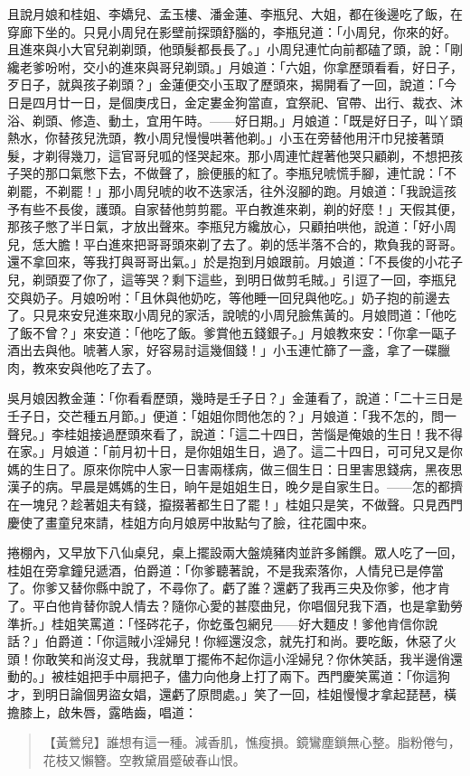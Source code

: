 且說月娘和桂姐、李嬌兒、孟玉樓、潘金蓮、李瓶兒、大姐，都在後邊吃了飯，在穿廊下坐的。只見小周兒在影壁前探頭舒腦的，李瓶兒道：「小周兒，你來的好。且進來與小大官兒剃剃頭，他頭髮都長長了。」小周兒連忙向前都磕了頭，說：「剛纔老爹吩咐，交小的進來與哥兒剃頭。」月娘道：「六姐，你拿歷頭看看，好日子，歹日子，就與孩子剃頭？」金蓮便交小玉取了歷頭來，揭開看了一回，說道：「今日是四月廿一日，是個庚戌日，金定婁金狗當直，宜祭祀、官帶、出行、裁衣、沐浴、剃頭、修造、動土，宜用午時。——好日期。」月娘道：「既是好日子，叫丫頭熱水，你替孩兒洗頭，教小周兒慢慢哄著他剃。」小玉在旁替他用汗巾兒接著頭髮，才剃得幾刀，這官哥兒呱的怪哭起來。那小周連忙趕著他哭只顧剃，不想把孩子哭的那口氣憋下去，不做聲了，臉便脹的紅了。李瓶兒唬慌手腳，連忙說：「不剃罷，不剃罷！」那小周兒唬的收不迭家活，往外沒腳的跑。月娘道：「我說這孩予有些不長俊，護頭。自家替他剪剪罷。平白教進來剃，剃的好麼！」天假其便，那孩子憋了半日氣，才放出聲來。李瓶兒方纔放心，只顧拍哄他，說道：「好小周兒，恁大膽！平白進來把哥哥頭來剃了去了。剃的恁半落不合的，欺負我的哥哥。還不拿回來，等我打與哥哥出氣。」於是抱到月娘跟前。月娘道：「不長俊的小花子兒，剃頭耍了你了，這等哭？剩下這些，到明日做剪毛賊。」引逗了一回，李瓶兒交與奶子。月娘吩咐：「且休與他奶吃，等他睡一回兒與他吃。」奶子抱的前邊去了。只見來安兒進來取小周兒的家活，說唬的小周兒臉焦黃的。月娘問道：「他吃了飯不曾？」來安道：「他吃了飯。爹賞他五錢銀子。」月娘教來安：「你拿一甌子酒出去與他。唬著人家，好容易討這幾個錢！」小玉連忙篩了一盞，拿了一碟臘肉，教來安與他吃了去了。

吳月娘因教金蓮：「你看看歷頭，幾時是壬子日？」金蓮看了，說道：「二十三日是壬子日，交芒種五月節。」便道：「姐姐你問他怎的？」月娘道：「我不怎的，問一聲兒。」李桂姐接過歷頭來看了，說道：「這二十四日，苦惱是俺娘的生日！我不得在家。」月娘道：「前月初十日，是你姐姐生日，過了。這二十四日，可可兒又是你媽的生日了。原來你院中人家一日害兩樣病，做三個生日：日里害思錢病，黑夜思漢子的病。早晨是媽媽的生日，晌午是姐姐生日，晚夕是自家生日。——怎的都擠在一塊兒？趁著姐夫有錢，攛掇著都生日了罷！」桂姐只是笑，不做聲。只見西門慶使了畫童兒來請，桂姐方向月娘房中妝點勻了臉，往花園中來。

捲棚內，又早放下八仙桌兒，桌上擺設兩大盤燒豬肉並許多餚饌。眾人吃了一回，桂姐在旁拿鐘兒遞酒，伯爵道：「你爹聽著說，不是我索落你，人情兒已是停當了。你爹又替你縣中說了，不尋你了。虧了誰？還虧了我再三央及你爹，他才肯了。平白他肯替你說人情去？隨你心愛的甚麼曲兒，你唱個兒我下酒，也是拿勤勞準折。」桂姐笑罵道：「怪硶花子，你虼蚤包網兒——好大麵皮！爹他肯信你說話？」伯爵道：「你這賊小淫婦兒！你經還沒念，就先打和尚。要吃飯，休惡了火頭！你敢笑和尚沒丈母，我就單丁擺佈不起你這小淫婦兒？你休笑話，我半邊俏還動的。」被桂姐把手中扇把子，儘力向他身上打了兩下。西門慶笑罵道：「你這狗才，到明日論個男盜女娼，還虧了原問處。」笑了一回，桂姐慢慢才拿起琵琶，橫擔膝上，啟朱唇，露皓齒，唱道：
\begin{quote}
【黃鶯兒】誰想有這一種。減香肌，憔瘦損。鏡鸞塵鎖無心整。脂粉倦勻，花枝又懶簪。空教黛眉蹙破春山恨。
\end{quote}

